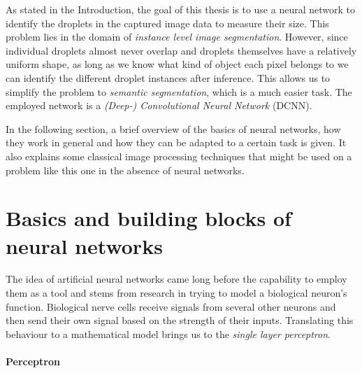 As stated in the Introduction, the goal of this thesis is to use a neural network to identify the droplets in the captured image data to measure their size. 
This problem lies in the domain of \emph{instance level image segmentation}.
However, since individual droplets almost never overlap and droplets themselves have a relatively uniform shape, as long as we know what kind of object each pixel belongs to we can identify the different droplet instances after inference.
This allows us to simplify the problem to \emph{semantic segmentation}, which is a much easier task.
The employed network is a \emph{(Deep-) Convolutional Neural Network} (DCNN). 

In the following section, a brief overview of the basics of neural networks, how they work in general and how they can be adapted to a certain task is given. It also explains some classical image processing techniques that might be used on a problem like this one in the absence of neural networks.

\section{Basics and building blocks of neural networks}
\label{sec:building_blocks}

The idea of artificial neural networks came long before the capability to employ them as a tool and stems from research in trying to model a biological neuron's function. Biological nerve cells receive signals from several other neurons and then send their own signal based on the strength of their inputs. Translating this behaviour to a mathematical model brings us to the \emph{single layer perceptron}.

\paragraph*{Perceptron}

